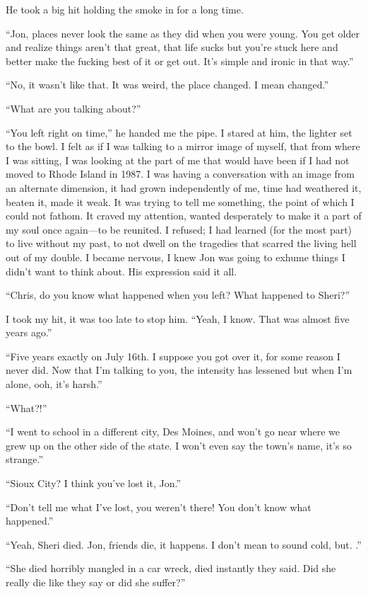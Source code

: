 He took a big hit holding the smoke in for a long time.

``Jon, places never look the same as they did when you were young. You
get older and realize things aren't that great, that life sucks but
you're stuck here and better make the fucking best of it or get out.
It's simple and ironic in that way.''

``No, it wasn't like that. It was weird, the place changed. I mean
changed.''

``What are you talking about?''

``You left right on time,'' he handed me the pipe. I stared at him, the
lighter set to the bowl. I felt as if I was talking to a mirror image of
myself, that from where I was sitting, I was looking at the part of me
that would have been if I had not moved to Rhode Island in 1987. I was
having a conversation with an image from an alternate dimension, it had
grown independently of me, time had weathered it, beaten it, made it
weak. It was trying to tell me something, the point of which I could not
fathom. It craved my attention, wanted desperately to make it a part of
my soul once again---to be reunited. I refused; I had learned (for the
most part) to live without my past, to not dwell on the tragedies that
scarred the living hell out of my double. I became nervous, I knew Jon
was going to exhume things I didn't want to think about. His expression
said it all.

``Chris, do you know what happened when you left? What happened to
Sheri?''

I took my hit, it was too late to stop him. ``Yeah, I know. That was
almost five years ago.''

``Five years exactly on July 16th. I suppose you got over it, for some
reason I never did. Now that I'm talking to you, the intensity has
lessened but when I'm alone, ooh, it's harsh.''

``What?!''

``I went to school in a different city, Des Moines, and won't go near
where we grew up on the other side of the state. I won't even say the
town's name, it's so strange.''

``Sioux City? I think you've lost it, Jon.''

``Don't tell me what I've lost, you weren't there! You don't know what
happened.''

``Yeah, Sheri died. Jon, friends die, it happens. I don't mean to sound
cold, but. .''

``She died horribly mangled in a car wreck, died instantly they said.
Did she really die like they say or did she suffer?''

